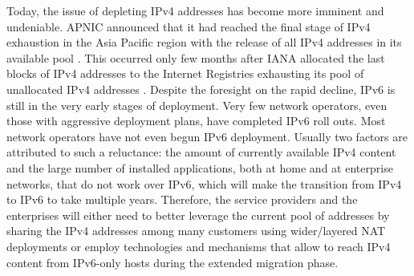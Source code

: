 \documentclass{llncs}
\begin{document}
Today, the issue of depleting IPv4 addresses has become more imminent and undeniable. APNIC announced that it had reached the final stage of IPv4 exhaustion in the Asia Pacific region with the release of all IPv4 addresses in its available pool \cite{APNIC}. This occurred only few months after IANA allocated the last blocks of IPv4 addresses to the Internet Registries exhausting its pool of unallocated IPv4 addresses \cite{iana}. Despite the foresight on the rapid decline, IPv6 is still in the very early stages of deployment. Very few network operators, even those with aggressive deployment plans, have completed IPv6 roll outs. Most network operators have not even begun IPv6 deployment. Usually two factors are attributed to such a reluctance: the amount of currently available IPv4 content and the large number of installed applications, both at home and at enterprise networks, that do not work over IPv6, which will make the transition from IPv4 to IPv6 to take multiple years.
Therefore, the service providers and the enterprises will either need to better leverage the current pool of addresses by sharing the IPv4 addresses among many customers using wider/layered NAT deployments or employ technologies and mechanisms that allow to reach IPv4 content from IPv6-only hosts during the extended migration phase.  
\end{document}

